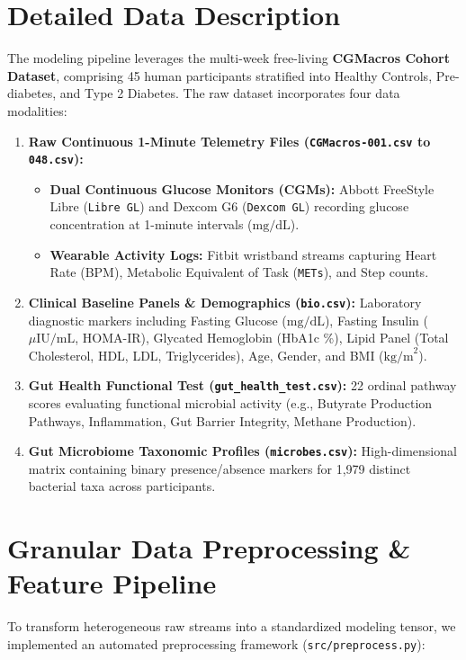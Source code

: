\documentclass[11pt,a4paper]{article}
\begin{document}
\section{Detailed Data Description}
The modeling pipeline leverages the multi-week free-living \textbf{CGMacros Cohort Dataset}, comprising 45 human participants stratified into Healthy Controls, Pre-diabetes, and Type 2 Diabetes. The raw dataset incorporates four data modalities:

\begin{enumerate}
    \item \textbf{Raw Continuous 1-Minute Telemetry Files (\texttt{CGMacros-001.csv} to \texttt{048.csv}):}
    \begin{itemize}
        \item \textbf{Dual Continuous Glucose Monitors (CGMs):} Abbott FreeStyle Libre (\texttt{Libre GL}) and Dexcom G6 (\texttt{Dexcom GL}) recording glucose concentration at 1-minute intervals ($\text{mg/dL}$).
        \item \textbf{Wearable Activity Logs:} Fitbit wristband streams capturing Heart Rate (BPM), Metabolic Equivalent of Task (\texttt{METs}), and Step counts.
    \end{itemize}

    \item \textbf{Clinical Baseline Panels \& Demographics (\texttt{bio.csv}):}
    Laboratory diagnostic markers including Fasting Glucose ($\text{mg/dL}$), Fasting Insulin ($\mu\text{IU/mL}$, HOMA-IR), Glycated Hemoglobin (HbA1c \%), Lipid Panel (Total Cholesterol, HDL, LDL, Triglycerides), Age, Gender, and BMI ($\text{kg/m}^2$).

    \item \textbf{Gut Health Functional Test (\texttt{gut\_health\_test.csv}):}
    22 ordinal pathway scores evaluating functional microbial activity (e.g., Butyrate Production Pathways, Inflammation, Gut Barrier Integrity, Methane Production).

    \item \textbf{Gut Microbiome Taxonomic Profiles (\texttt{microbes.csv}):}
    High-dimensional matrix containing binary presence/absence markers for 1,979 distinct bacterial taxa across participants.
\end{enumerate}

\section{Granular Data Preprocessing \& Feature Pipeline}
To transform heterogeneous raw streams into a standardized modeling tensor, we implemented an automated preprocessing framework (\texttt{src/preprocess.py}):
\end{document}
